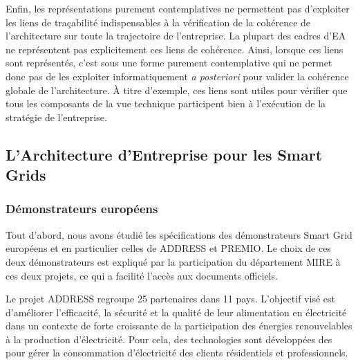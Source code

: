  Enfin, les représentations purement contemplatives ne permettent pas
d'exploiter les liens de traçabilité indispensables à la vérification de la
cohérence de l'architecture sur toute la trajectoire de l'entreprise. La
plupart des cadres d'EA ne représentent pas explicitement ces liens de
cohérence. Ainsi, lorsque ces liens sont représentés, c'est sous une forme
purement contemplative qui ne permet donc pas de les exploiter informatiquement
\textit{a posteriori} pour valider la cohérence globale de l'architecture. À
titre d'exemple, ces liens sont utiles pour vérifier que tous les composants de
la vue technique participent bien à l'exécution de la stratégie de
l'entreprise.

	\subsection{L'Architecture d'Entreprise pour les Smart Grids}



\subsubsection{Démonstrateurs européens}
\label{sec:DemonstrateursSG}

Tout d'abord, nous avons étudié les spécifications des démonstrateurs Smart Grid
européens et en particulier celles de ADDRESS et PREMIO. Le choix de ces deux
démonstrateurs est expliqué par la participation du département MIRE à ces deux
projets, ce qui a facilité l'accès aux documents officiels.



Le projet ADDRESS regroupe 25 partenaires dans 11 pays. L'objectif visé est
d'améliorer l'efficacité, la sécurité et la qualité de leur alimentation en
électricité dans un contexte de forte croissante de la participation des
énergies renouvelables à la production d'électricité. Pour cela, des
technologies sont développées des pour gérer la consommation d'électricité des
clients résidentiels et professionnels.

